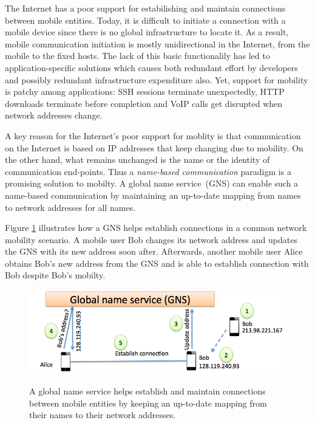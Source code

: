 The Internet has a poor support for estabilishing and maintain connections between mobile entities. Today, it is difficult to initiate a connection with a mobile device since there is no global infrastructure to locate it. As a result, mobile communication initiation is mostly unidirectional in the Internet, from the mobile to the fixed hosts. The lack of this basic functionalily has led to application-specific solutions which causes both redundant effort by developers and possibly redundant infrastructure expenditure also. Yet, support for mobility is patchy among applications: SSH sessions terminate unexpectedly, HTTP downloads terminate before completion and VoIP calls get disrupted when network addresses change.

A key reason for the Internet's poor support for moblity is that communication on the Internet is based on IP addresses that keep changing due to mobility. On the other hand, what remains unchanged is the name or the identity of communication end-points. Thus a \emph{name-based communication} paradigm is a promising solution to mobilty. A  global name service (GNS) can enable such a name-based communication by maintaining an up-to-date mapping from names to network addresses for all names. 

Figure \ref{fig:gns-example} illustrates how a GNS helps establish connections in a common network mobility scenario. A mobile user Bob changes its network address and updates the GNS with its new address soon after. Afterwards, another mobile user Alice obtains Bob's new address from the GNS and is able to establish connection with Bob despite Bob's mobilty.

\begin{figure}
	\centering
	\includegraphics[scale=0.4]{fig/gns-example.png}
	\label{fig:gns-example}
	\caption{A global name service helps establish and maintain connections between mobile entities by keeping an up-to-date mapping from their names to their network addresses.}
\end{figure}

